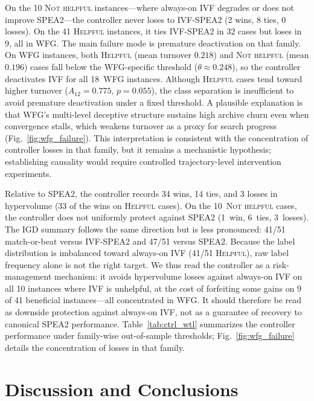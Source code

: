 \documentclass[conference]{IEEEtran}
\begin{document}
On the 10 \textsc{Not helpful} instances---where always-on IVF degrades or does
not improve SPEA2---the controller never loses to IVF-SPEA2 (2 wins, 8 ties,
0 losses). On the 41 \textsc{Helpful} instances, it ties IVF-SPEA2 in 32 cases
but loses in 9, all in WFG. The main failure mode is premature
deactivation on that family. On WFG instances, both \textsc{Helpful}
(mean turnover $0.218$) and \textsc{Not helpful} (mean $0.196$) cases fall
below the WFG-specific threshold ($\theta \approx 0.248$), so the
controller deactivates IVF for all 18~WFG instances. Although
\textsc{Helpful} cases tend toward higher turnover
($\hat{A}_{12}=0.775$, $p=0.055$), the class separation is insufficient
to avoid premature deactivation under a fixed threshold. A plausible
explanation is that WFG's multi-level deceptive structure sustains high
archive churn even when convergence stalls, which weakens turnover as a
proxy for search progress (Fig.~\ref{fig:wfg_failure}).
This interpretation is consistent with the concentration of controller
losses in that family, but it remains a mechanistic hypothesis;
establishing causality would require controlled trajectory-level
intervention experiments.

Relative to SPEA2, the controller records 34 wins, 14 ties, and 3 losses
in hypervolume (33 of the wins on \textsc{Helpful} cases). On the
10~\textsc{Not helpful} cases, the controller does not uniformly protect
against SPEA2 (1~win, 6~ties, 3~losses). The IGD summary follows the same
direction but is less pronounced: 41/51 match-or-beat versus IVF-SPEA2 and
47/51 versus SPEA2. Because the label distribution is imbalanced toward
always-on IVF (41/51 \textsc{Helpful}), raw label frequency alone is not the
right target. We thus read the controller as a risk-management mechanism:
it avoids hypervolume losses against always-on IVF on all 10 instances where
IVF is unhelpful, at the cost of forfeiting some gains on 9 of 41 beneficial
instances---all concentrated in WFG. It should therefore be read as downside
protection against always-on IVF, not as a guarantee of recovery to canonical
SPEA2 performance.
Table~\ref{tab:ctrl_wtl} summarizes the controller performance under
family-wise out-of-sample thresholds; Fig.~\ref{fig:wfg_failure} details
the concentration of losses in that family.

\section{Discussion and Conclusions}
\label{sec:conclusion}
\end{document}
